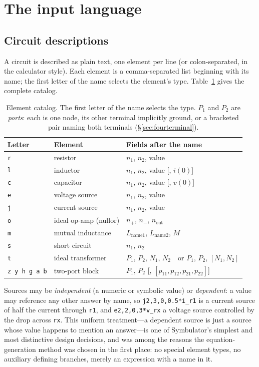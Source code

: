 \documentclass[11pt,oneside]{report}
\newcommand{\code}[1]{\texttt{#1}}
\begin{document}
\section{The input language}
\label{sec:input}

\subsection{Circuit descriptions}

A circuit is described as plain text, one element per line (or
colon-separated, in the calculator style). Each element is a
comma-separated list beginning with its name; the first letter of the
name selects the element's type. Table~\ref{tab:elements} gives the
complete catalog.

\begin{table}[htbp]
\caption{Element catalog. The first letter of the name selects the type.
$P_1$ and $P_2$ are \emph{ports}: each is one node, its other terminal
implicitly ground, or a bracketed pair naming both terminals
(\S\ref{sec:fourterminal}).}
\label{tab:elements}
\centering
\begin{tabular}{@{}lll@{}}
\toprule
Letter & Element & Fields after the name \\
\midrule
\code{r} & resistor & $n_1$, $n_2$, value \\
\code{l} & inductor & $n_1$, $n_2$, value [, $i(0)$] \\
\code{c} & capacitor & $n_1$, $n_2$, value [, $v(0)$] \\
\code{e} & voltage source & $n_1$, $n_2$, value \\
\code{j} & current source & $n_1$, $n_2$, value \\
\code{o} & ideal op-amp (nullor) & $n_+$, $n_-$, $n_\mathrm{out}$ \\
\code{m} & mutual inductance & $L_\mathrm{name1}$, $L_\mathrm{name2}$, $M$ \\
\code{s} & short circuit & $n_1$, $n_2$ \\
\code{t} & ideal transformer & $P_1$, $P_2$, $N_1$, $N_2$\ \ or
  $P_1$, $P_2$, $[N_1,N_2]$ \\
\code{z y h g a b} & two-port block & $P_1$, $P_2$
  [, $[p_{11},p_{12},p_{21},p_{22}]$] \\
\bottomrule
\end{tabular}
\end{table}

Sources may be \emph{independent} (a numeric or symbolic value) or
\emph{dependent}: a value may reference any other answer by name, so
\code{j2,3,0,0.5*i\_r1} is a current source of half the current
through \code{r1}, and \code{e2,2,0,3*v\_rx} a voltage source
controlled by the drop across \code{rx}. This uniform treatment---a
dependent source is just a source whose value happens to mention an
answer---is one of Symbulator's simplest and most distinctive design
decisions, and was among the reasons the equation-generation method
was chosen in the first place: no special element types, no auxiliary
defining branches, merely an expression with a name in it.
\end{document}
